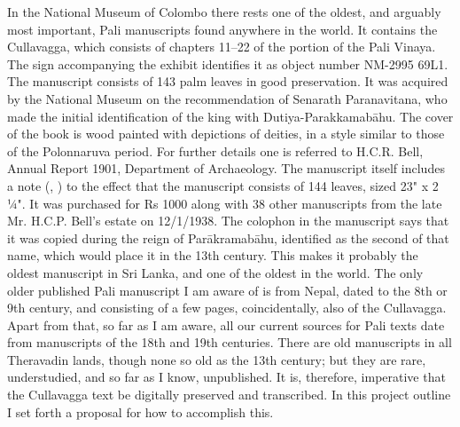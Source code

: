 \markdownRendererInterblockSeparator
{}In the National Museum of Colombo there rests one of the oldest, and arguably most important, Pali manuscripts found anywhere in the world. It contains the Cullavagga, which consists of chapters 11–22 of the  portion of the Pali Vinaya.\markdownRendererInterblockSeparator
{}\markdownRendererInterblockSeparator
{}The sign accompanying the exhibit identifies it as object number NM-2995 69L1. The manuscript consists of 143 palm leaves in good preservation. It was acquired by the National Museum on the recommendation of Senarath Paranavitana, who made the initial identification of the king with Dutiya-Parakkamabāhu. The cover of the book is wood painted with depictions of deities, in a style similar to those of the Polonnaruva period. For further details one is referred to H.C.R. Bell, Annual Report 1901, Department of Archaeology.\markdownRendererInterblockSeparator
{}The manuscript itself includes a note (, ) to the effect that the manuscript consists of 144 leaves, sized 23" x 2 ¼". It was purchased for Rs 1000 along with 38 other manuscripts from the late Mr. H.C.P. Bell’s estate on 12/1/1938.\markdownRendererInterblockSeparator
{}The colophon in the manuscript says that it was copied during the reign of Parākramabāhu, identified as the second of that name, which would place it in the 13th century. This makes it probably the oldest manuscript in Sri Lanka, and one of the oldest in the world. The only older published Pali manuscript I am aware of is from Nepal, dated to the 8th or 9th century, and consisting of a few pages, coincidentally, also of the Cullavagga.\markdownRendererInterblockSeparator
{}Apart from that, so far as I am aware, all our current sources for Pali texts date from manuscripts of the 18th and 19th centuries. There are old manuscripts in all Theravadin lands, though none so old as the 13th century; but they are rare, understudied, and so far as I know, unpublished.\markdownRendererInterblockSeparator
{}It is, therefore, imperative that the Cullavagga text be digitally preserved and transcribed. In this project outline I set forth a proposal for how to accomplish this.\markdownRendererInterblockSeparator
